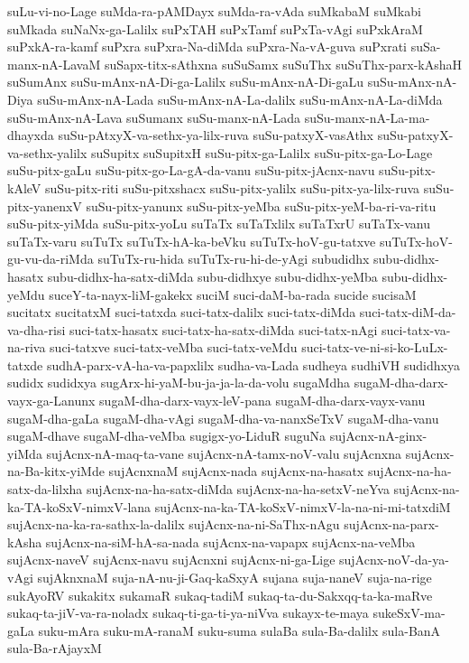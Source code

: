 {suLu-vi-no-Lage
suMda-ra-pAMDayx
suMda-ra-vAda
suMkabaM
suMkabi
suMkada
suNaNx-ga-Lalilx
suPxTAH
suPxTamf
suPxTa-vAgi
suPxkAraM
suPxkA-ra-kamf
suPxra
suPxra-Na-diMda
suPxra-Na-vA-guva
suPxrati
suSa-manx-nA-LavaM
suSapx-titx-sAthxna
suSuSamx
suSuThx
suSuThx-parx-kAshaH
suSumAnx
suSu-mAnx-nA-Di-ga-Lalilx
suSu-mAnx-nA-Di-gaLu
suSu-mAnx-nA-Diya
suSu-mAnx-nA-Lada
suSu-mAnx-nA-La-dalilx
suSu-mAnx-nA-La-diMda
suSu-mAnx-nA-Lava
suSumanx
suSu-manx-nA-Lada
suSu-manx-nA-La-ma-dhayxda
suSu-pAtxyX-va-sethx-ya-lilx-ruva
suSu-patxyX-vasAthx
suSu-patxyX-va-sethx-yalilx
suSupitx
suSupitxH
suSu-pitx-ga-Lalilx
suSu-pitx-ga-Lo-Lage
suSu-pitx-gaLu
suSu-pitx-go-La-gA-da-vanu
suSu-pitx-jAcnx-navu
suSu-pitx-kAleV
suSu-pitx-riti
suSu-pitxshacx
suSu-pitx-yalilx
suSu-pitx-ya-lilx-ruva
suSu-pitx-yanenxV
suSu-pitx-yanunx
suSu-pitx-yeMba
suSu-pitx-yeM-ba-ri-va-ritu
suSu-pitx-yiMda
suSu-pitx-yoLu
suTaTx
suTaTxlilx
suTaTxrU
suTaTx-vanu
suTaTx-varu
suTuTx
suTuTx-hA-ka-beVku
suTuTx-hoV-gu-tatxve
suTuTx-hoV-gu-vu-da-riMda
suTuTx-ru-hida
suTuTx-ru-hi-de-yAgi
subudidhx
subu-didhx-hasatx
subu-didhx-ha-satx-diMda
subu-didhxye
subu-didhx-yeMba
subu-didhx-yeMdu
suceY-ta-nayx-liM-gakekx
suciM
suci-daM-ba-rada
sucide
sucisaM
sucitatx
sucitatxM
suci-tatxda
suci-tatx-dalilx
suci-tatx-diMda
suci-tatx-diM-da-va-dha-risi
suci-tatx-hasatx
suci-tatx-ha-satx-diMda
suci-tatx-nAgi
suci-tatx-va-na-riva
suci-tatxve
suci-tatx-veMba
suci-tatx-veMdu
suci-tatx-ve-ni-si-ko-LuLx-tatxde
sudhA-parx-vA-ha-va-papxlilx
sudha-va-Lada
sudheya
sudhiVH
sudidhxya
sudidx
sudidxya
sugArx-hi-yaM-bu-ja-ja-la-da-volu
sugaMdha
sugaM-dha-darx-vayx-ga-Lanunx
sugaM-dha-darx-vayx-leV-pana
sugaM-dha-darx-vayx-vanu
sugaM-dha-gaLa
sugaM-dha-vAgi
sugaM-dha-va-nanxSeTxV
sugaM-dha-vanu
sugaM-dhave
sugaM-dha-veMba
sugigx-yo-LiduR
suguNa
sujAcnx-nA-ginx-yiMda
sujAcnx-nA-maq-ta-vane
sujAcnx-nA-tamx-noV-valu
sujAcnxna
sujAcnx-na-Ba-kitx-yiMde
sujAcnxnaM
sujAcnx-nada
sujAcnx-na-hasatx
sujAcnx-na-ha-satx-da-lilxha
sujAcnx-na-ha-satx-diMda
sujAcnx-na-ha-setxV-neYva
sujAcnx-na-ka-TA-koSxV-nimxV-lana
sujAcnx-na-ka-TA-koSxV-nimxV-la-na-ni-mi-tatxdiM
sujAcnx-na-ka-ra-sathx-la-dalilx
sujAcnx-na-ni-SaThx-nAgu
sujAcnx-na-parx-kAsha
sujAcnx-na-siM-hA-sa-nada
sujAcnx-na-vapapx
sujAcnx-na-veMba
sujAcnx-naveV
sujAcnx-navu
sujAcnxni
sujAcnx-ni-ga-Lige
sujAcnx-noV-da-ya-vAgi
sujAknxnaM
suja-nA-nu-ji-Gaq-kaSxyA
sujana
suja-naneV
suja-na-rige
sukAyoRV
sukakitx
sukamaR
sukaq-tadiM
sukaq-ta-du-Sakxqq-ta-ka-maRve
sukaq-ta-jiV-va-ra-noladx
sukaq-ti-ga-ti-ya-niVva
sukayx-te-maya
sukeSxV-ma-gaLa
suku-mAra
suku-mA-ranaM
suku-suma
sulaBa
sula-Ba-dalilx
sula-BanA
sula-Ba-rAjayxM
}
